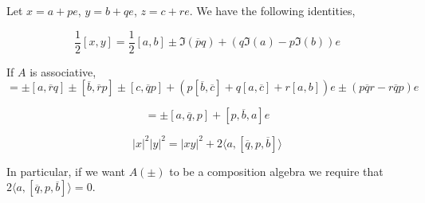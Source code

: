 \begin{lemma}
Let $x = a+pe$, $y= b+qe$, $z = c+re$.
We have the following identities,
\begin{enumerate}[(i)]
    \item \begin{equation}
        \frac{1}{2}[x,y] = \frac{1}{2}[a,b]\pm\Im(\overline{p}q)+(q\Im(a)-p\Im(b))e
    \end{equation}
    \item If $A$ is associative, \begin{equation}
        [x,y,z] = \pm [a,\overline{r}q]\pm[\overline{b},\overline{r}p]\pm [c,\overline{q}p]+(p[\overline{b},\overline{c}]+q[a,\overline{c}]+r[a,b])e\pm (p\overline{q}r-r\overline{q}p)e  \label{eq:assoc72}  
    \end{equation}
    \item {
    \begin{equation}
        [x,\overline{x},y]=\pm[a,\overline{q},p]+[p,\overline{b},a]e\label{eq:assoc73}
    \end{equation}
    \item {
    \begin{equation}
        |x|^2|y|^2 = |xy|^2 + 2\langle a,[\overline{q},p,\overline{b}]\rangle\label{eq:assoc74}
    \end{equation}
    }
    }
\end{enumerate}
    In particular, if we want $A(\pm)$ to be a composition algebra we require that $2\langle a,[\overline{q},p,\overline{b}]\rangle=0$.
\end{lemma}

